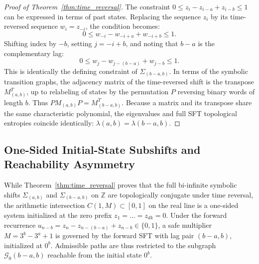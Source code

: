 \documentclass[11pt,reqno]{amsart}
\theoremstyle{plain}
\theoremstyle{definition}
\theoremstyle{remark}
\newcommand{\Z}{\mathbb{Z}}
\begin{document}
\begin{proof}[Proof of Theorem~\ref{thm:time_reversal}]
The constraint $0 \le z_i - z_{i-a} + z_{i-b} \le 1$ can be expressed in terms of past states. Replacing the sequence $z_i$ by its time-reversed sequence $w_i = z_{-i}$, the condition becomes:
\begin{equation}
0 \le w_{-i} - w_{-i+a} + w_{-i+b} \le 1.
\end{equation}
Shifting index by $-b$, setting $j = -i + b$, and noting that $b - a$ is the complementary lag:
\begin{equation}
0 \le w_j - w_{j - (b-a)} + w_{j-b} \le 1.
\end{equation}
This is identically the defining constraint of $\Sigma_{(b-a, b)}$. In terms of the symbolic transition graphs, the adjacency matrix of the time-reversed shift is the transpose $M_{(a,b)}^T$, up to relabeling of states by the permutation $P$ reversing binary words of length $b$. Thus $P M_{(a,b)} P = M_{(b-a, b)}^T$. Because a matrix and its transpose share the same characteristic polynomial, the eigenvalues and full SFT topological entropies coincide identically: $\lambda(a, b) = \lambda(b-a, b)$.
\end{proof}

\subsection{One-Sided Initial-State Subshifts and Reachability Asymmetry}
While Theorem~\ref{thm:time_reversal} proves that the full bi-infinite symbolic shifts $\Sigma_{(a, b)}$ and $\Sigma_{(b-a, b)}$ on $\Z$ are topologically conjugate under time reversal, the arithmetic intersection $C(1, M) \subset [0, 1]$ on the real line is a one-sided system initialized at the zero prefix $z_1 = \dots = z_{dk} = 0$.
Under the forward recurrence $u_{n-b} = z_n - z_{n-(b-a)} + z_{n-b} \in \{0, 1\}$, a safe multiplier $M = 3^b - 3^a + 1$ is governed by the forward SFT with lag pair $(b-a, b)$, initialized at $0^b$. Admissible paths are thus restricted to the subgraph $\mathcal{G}_0(b-a, b)$ reachable from the initial state $0^b$.
\end{document}
